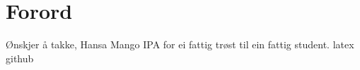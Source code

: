 \chapter*{Forord}
\thispagestyle{fancy}
Ønskjer å takke, Hansa Mango IPA for ei fattig trøst til ein fattig student.
\newline
\gls{latex}
\gls{github}


\thispagestyle{empty}